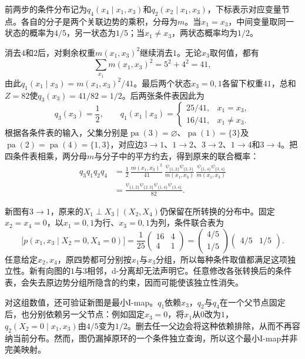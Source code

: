 前两步的条件分布记为$q_4(x_4\mid x_1,x_3)$和$q_2(x_2\mid x_1,x_3)$，下标表示对应变量节点。各自的分子是两个关联边势的乘积，分母为$m$。当$x_1=x_3$，中间变量取同一状态的概率为$4/5$，另一状态为$1/5$；当$x_1\ne x_3$，两状态概率均为$1/2$。

消去$4$和$2$后，对剩余权重$m(x_1,x_3)^2$继续消去$1$。无论$x_3$取何值，都有
\[
  \sum_{x_1}m(x_1,x_3)^2=5^2+4^2=41,
\]
由此$q_1(x_1\mid x_3)=m(x_1,x_3)^2/41$。最后两个状态$x_3=0,1$各留下权重$41$，总和$Z=82$使$q_3(x_3)=41/82=1/2$。后两张条件表因此为
\begin{equation}
  q_3(x_3)=\frac12,\qquad
  q_1(x_1\mid x_3)=
  \begin{cases}
    25/41,&x_1=x_3,\\
    16/41,&x_1\ne x_3.
  \end{cases}
  \label{eq:pgm-representations-cycle-root-tables}
\end{equation}
根据各条件表的输入，父集分别是$\operatorname{pa}(3)=\varnothing$、$\operatorname{pa}(1)=\{3\}$及$\operatorname{pa}(2)=\operatorname{pa}(4)=\{1,3\}$，对应边$3\to1$、$1\to2$、$3\to2$、$1\to4$和$3\to4$。把四条件表相乘，两分母$m$与分子中的平方约去，得到原来的联合概率：
\[
  \begin{aligned}
    q_3q_1q_2q_4
    &=\frac12\,
      \frac{m(x_1,x_3)^2}{41}\,
      \frac{\psi_{\{1,2\}}\psi_{\{2,3\}}}{m(x_1,x_3)}\,
      \frac{\psi_{\{1,4\}}\psi_{\{3,4\}}}{m(x_1,x_3)}\\
    &=\frac{
      \psi_{\{1,2\}}\psi_{\{2,3\}}
      \psi_{\{1,4\}}\psi_{\{3,4\}}}{82}.
  \end{aligned}
\]

新图有$3\to1$，原来的$X_1\perp X_3\mid(X_2,X_4)$仍保留在所转换的分布中。固定$x_2=x_4=0$，以$x_1=0,1$为行、$x_3=0,1$为列，条件联合表为
\[
  \bigl[p(x_1,x_3\mid X_2=0,X_4=0)\bigr]
  =\frac1{25}
  \begin{pmatrix}16&4\\4&1\end{pmatrix}
  =
  \begin{pmatrix}4/5\\1/5\end{pmatrix}
  \begin{pmatrix}4/5&1/5\end{pmatrix}.
\]
任意给定$x_2,x_4$，原四势都可分别按$x_1$与$x_3$分组，所以每种条件取值都满足这项独立性。新有向图的$1$与$3$相邻，d-分离却无法声明它。任意修改各张转换后的条件表，会失去原边势分组所隐含的约束，因而可能使该独立性消失。

对这组数值，还可验证新图是最小I-map。$q_1$依赖$x_3$，$q_2$与$q_4$在一个父节点固定后，也分别依赖另一父节点：例如固定$x_3=0$，将$x_1$从$0$改为$1$，$q_2(X_2=0\mid x_1,x_3)$由$4/5$变为$1/2$。删去任一父边会将这种依赖排除，从而不再容纳当前分布。然而，图仍漏掉原环的一个条件独立查询，所以这个最小I-map并非完美映射。

